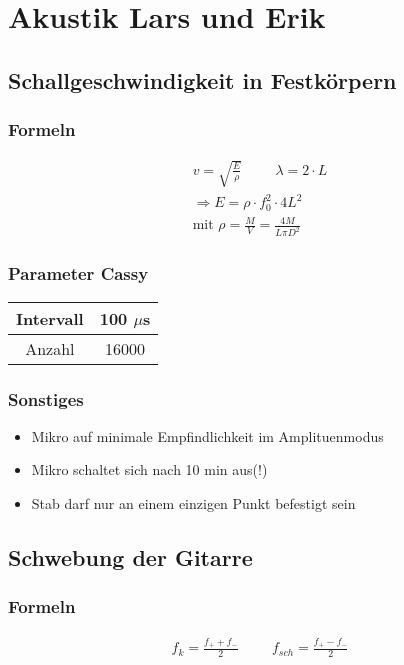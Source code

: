\documentclass[10pt,a4paper]{article}
\begin{document}
\section{Akustik Lars und Erik}
\subsection{Schallgeschwindigkeit in Festkörpern}
\subsubsection{Formeln}
\begin{align}
v=\sqrt{\frac{E}{\rho}}\hspace{1cm} \lambda= 2\cdot L\\
\Rightarrow E=\rho\cdot f_0^2 \cdot 4L^2\\
\text{mit } \rho= \frac{M}{V}=\frac{4M}{L\pi D^2}
\end{align}
\subsubsection{Parameter Cassy}
\begin{table}[H]\centering
\begin{tabular}{|c|c|}
\hline 
Intervall & 100 $\mu$s \\ 
\hline 
Anzahl & 16000 \\ 
\hline 
\end{tabular} 
\end{table}
\subsubsection{Sonstiges}
\begin{itemize}
\item Mikro auf minimale Empfindlichkeit im Amplituenmodus
\item Mikro schaltet sich nach 10 min aus(!)
\item Stab darf nur an einem einzigen Punkt befestigt sein
\end{itemize}
\subsection{Schwebung der Gitarre}
\subsubsection{Formeln}
\begin{align}
f_k=\frac{f_++f_-}{2} \hspace{1cm} f_{sch}=\frac{f_+-f_-}{2}
\end{align}
\end{document}
